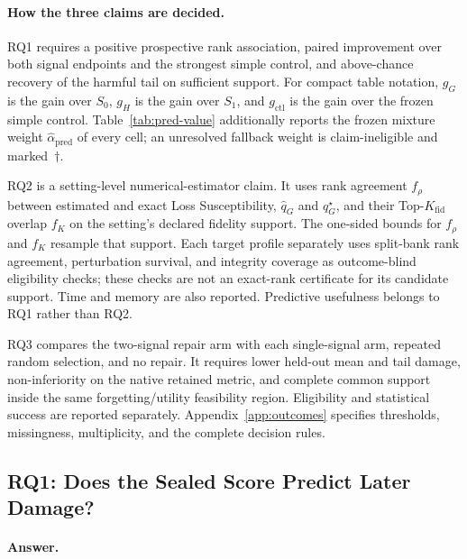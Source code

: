 \paragraph{How the three claims are decided.}
RQ1 requires a positive prospective rank association, paired improvement over
both signal endpoints and the strongest simple control, and above-chance
recovery of the harmful tail on sufficient support. For compact table
notation, $g_G$ is the gain over $S_0$, $g_H$ is the gain over $S_1$, and
$g_{\mathrm{ctl}}$ is the gain over the frozen simple control.
Table~\ref{tab:pred-value} additionally reports the frozen mixture weight
$\widehat\alpha_{\mathrm{pred}}$ of every cell; an unresolved fallback weight
is claim-ineligible and marked~$\dagger$.

RQ2 is a setting-level numerical-estimator claim. It uses rank agreement
$f_\rho$ between estimated and exact Loss Susceptibility,
$\widehat q_G$ and $q_G^\star$, and their Top-$K_{\mathrm{fid}}$ overlap $f_K$
on the setting's declared fidelity support. The one-sided bounds for $f_\rho$
and $f_K$ resample that support. Each target profile separately uses
split-bank rank agreement, perturbation survival, and integrity coverage as
outcome-blind eligibility checks; these checks are not an exact-rank
certificate for its candidate support. Time and memory are also reported.
Predictive usefulness belongs to RQ1 rather than RQ2.

RQ3 compares the two-signal repair arm with each single-signal arm, repeated
random selection, and no repair. It requires lower held-out mean and tail
damage, non-inferiority on the native retained metric, and complete common support
inside the same forgetting/utility feasibility region. Eligibility and
statistical success are reported separately. Appendix~\ref{app:outcomes}
specifies thresholds, missingness, multiplicity, and the complete decision
rules.




\subsection{RQ1: Does the Sealed Score Predict Later Damage?}
\label{sec:exp-prediction}

\paragraph{Answer.}
{\setlength{\emergencystretch}{3em}
\PredictionHeadline\ \TailHeadline\par}

